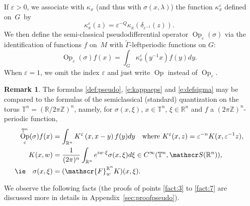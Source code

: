 \documentclass[10pt]{amsart}
\let\mathcal\mathscr
\DeclareMathOperator{\Op}{Op}
\theoremstyle{plain}
\theoremstyle{definition}
\newtheorem{remark}[theorem]{Remark}
\let\eps\varepsilon
\def\R{{\mathbb R}}
\def\Z{{\mathbb Z}}
\def\T{{\mathbb T}}
\begin{document}
If $\eps\!>\!0$, we associate with $\kappa_x$ (and thus with $\sigma(x,\lambda)$) the function $\kappa_x^\eps$ defined on~$G$~by
\begin{equation} \label{e:kappaeps}
\kappa^\eps_x(z)= \eps^{-Q} \kappa_x(\delta_{\eps^{-1}}(z)).
\end{equation}
We then define the semi-classical pseudodifferential operator $\Op_\eps(\sigma)$ via the identification of functions $f$ on~$M$ with $\widetilde{\Gamma}$-leftperiodic functions on $G$:
\begin{equation}\label{def:pseudo}
\Op_\eps(\sigma)f(x)= \int_{ G} \kappa_x^\eps(y^{-1} x) f(y)dy.
\end{equation}
When $\eps=1$, we omit the index $\eps$ and just write $\Op$ instead of $\Op_\eps$.
\begin{remark}
The formulas \eqref{def:pseudo}, \eqref{e:kappaeps} and \eqref{e:defsigma} may be compared to the formulas of the semiclassical (standard) quantization on the torus $\T^n= (\R/2\pi\Z)^{n}$, namely, for $\sigma(x,\xi)$, $x\in\T^n$, $\xi\in\R^n$ and $f$ a $(2\pi\Z)^n$-periodic function,
\begin{align*}
\Op_\eps^{\T^n}(\sigma)f(x)&=\int_{\R^n}K^\eps\left(x,x-y\right)f(y)dy\quad
\text{where } K^\eps(x,z)=\eps^{-n}K(x,\eps^{-1}z), \\
K(x,w)&=\frac{1}{(2\pi)^n}\int_{\R^n}e^{iw\cdot\xi} \sigma(x,\xi)d\xi\in C^\infty(\T^n,\mathcal S(\R^n)), \\
\text{\ie} \quad \sigma(x,\xi)&=(\mathcal{F}^{\R^n}_w K)(x,\xi).
\end{align*}
\end{remark}

We observe the following facts (the proofs of points \eqref{fact:3} to \eqref{fact:7} are discussed more in details in Appendix~\ref{sec:proofpseudo}).
\end{document}
